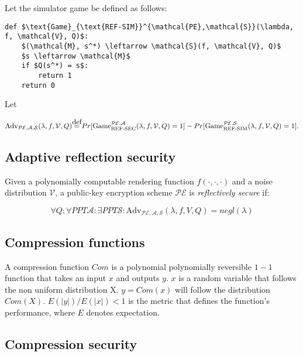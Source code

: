 \documentclass{article}
\newcommand\defeq{\stackrel{\mathclap{\normalfont\mbox{def}}}{=}}
\begin{document}
Let the simulator game be defined as follows:

\begin{lstlisting}[texcl,mathescape]
def $\text{Game}_{\text{REF-SIM}}^{\mathcal{PE},\mathcal{S}}(\lambda, f, \mathcal{V}, Q)$:
    $(\mathcal{M}, s^*) \leftarrow \mathcal{S}(f, \mathcal{V}, Q)$
    $s \leftarrow \mathcal{M}$
    if $Q(s^*) = s$:
        return 1
    return 0
\end{lstlisting}

Let

\begin{equation*}
    \text{Adv}_{\mathcal{PE}, \mathcal{A}, \mathcal{S}}(\lambda, f, \mathcal{V}, Q)
    \defeq
    Pr[\text{Game}_{\text{REF-SEC}}^{\mathcal{PE},\mathcal{A}}(\lambda, f, \mathcal{V}, Q) = 1]
    -
    Pr[\text{Game}_{\text{REF-SIM}}^{\mathcal{PE},\mathcal{S}}(\lambda, f, \mathcal{V}, Q) = 1].
\end{equation*}

\subsection*{Adaptive reflection security}

Given a polynomially computable rendering function $f(\cdot, \cdot, \cdot)$ and
a  noise distribution $\mathcal{V}$, a public-key encryption scheme
$\mathcal{PE}$ is \textit{reflectively secure} if:

\begin{equation*}
\forall Q:
\forall PPT \mathcal{A}:
\exists PPT \mathcal{S}:
\text{Adv}_{\mathcal{PE}, \mathcal{A}, \mathcal{S}}(\lambda, f, V, Q) = negl(\lambda)
\end{equation*}

\subsection*{Compression functions}

A compression function $Com$ is a polynomial polynomially reversible $1 - 1$
function that takes an input $x$ and outputs $y$. $x$ is a random variable that
follows the non uniform distribution X. $y = Com(x)$ will follow the
distribution $Com(X)$.  $E(|y|) / E(|x|) < 1$ is the metric that defines the
function's performance, where $E$ denotes expectation.

\subsection*{Compression security}
\end{document}
